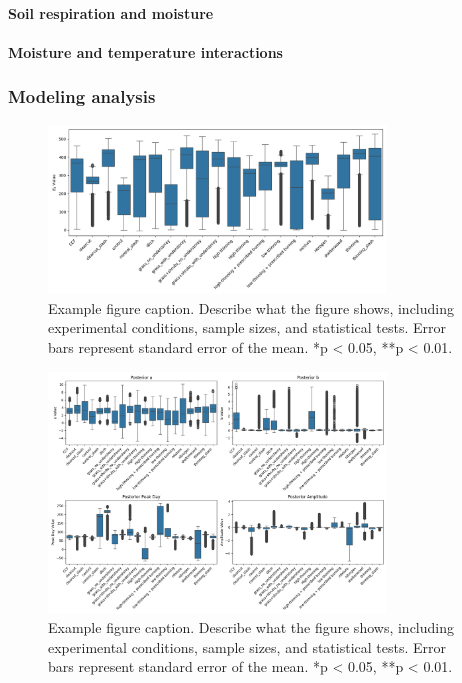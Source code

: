 \documentclass[12pt,a4paper]{article}
\begin{document}
\paragraph{Soil respiration and moisture}


\paragraph{Moisture and temperature interactions}


\subsubsection{Modeling analysis}

\begin{figure}[H]
    \centering
    \includegraphics[width=0.8\textwidth]{"../ea_boxplot.png"}
    \caption{Example figure caption. Describe what the figure shows, including experimental conditions, sample sizes, and statistical tests. Error bars represent standard error of the mean. *p < 0.05, **p < 0.01.}
    \label{fig:example}
\end{figure}


\begin{figure}[H]
    \centering
    \includegraphics[width=0.8\textwidth]{"../other_params.png"}
    \caption{Example figure caption. Describe what the figure shows, including experimental conditions, sample sizes, and statistical tests. Error bars represent standard error of the mean. *p < 0.05, **p < 0.01.}
    \label{fig:example}
\end{figure}
\end{document}
